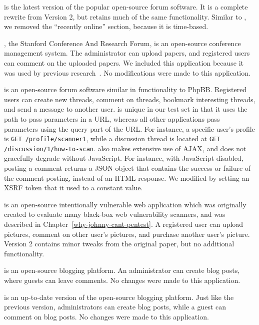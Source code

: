 \noindent \textbf{\phpbbthree{}} is the latest version of the popular
open-source forum software. It is a complete rewrite from Version 2, but
retains much of the same functionality. Similar to \phpbbtwo{}, we removed the
``recently online'' section, because it is time-based.

\noindent \textbf{\scarf{}}, the Stanford Conference And Research Forum, is an
open-source conference management system. The administrator can upload papers,
and registered users can comment on the uploaded papers. We included this
application because it was used by previous
research~\cite{li11:BLOCK,balzarotti07:mimosa,cova07:swaddler,li12:sentinel}. No modifications were made to
this application.

\noindent \textbf{\vanillaforums{}} is an open-source forum software similar in
functionality to PhpBB. Registered users can create new threads, comment on
threads, bookmark interesting threads, and send a message to another user.
\vanillaforums{} is unique in our test set in that it uses the path to pass
parameters in a URL, whereas all other applications pass parameters using the
query part of the URL. For instance, a specific user's profile is \texttt{GET
  /profile/scanner1}, while a discussion thread is located at \texttt{GET
  /discussion/1/how-to-scan}. \vanillaforums{} also makes extensive use of
AJAX, and does not gracefully degrade without JavaScript. For instance, with
JavaScript disabled, posting a comment returns a JSON object that contains the
success or failure of the comment posting, instead of an HTML response. We
modified \vanillaforums{} by setting an XSRF token that it used to a constant
value.

\noindent \textbf{\wackopicko{}} is an open-source intentionally vulnerable web
application which was originally created to evaluate many black-box web
vulnerability scanners, and was described in Chapter~\ref{why-johnny-cant-pentest}. A registered user can upload
pictures, comment on other user's pictures, and purchase another user's
picture. Version 2 contains minor tweaks from the original paper, but no
additional functionality.

\noindent \textbf{\wordpresstwo{}} is an open-source blogging platform. An
administrator can create blog posts, where guests can leave comments. No
changes were made to this application.

\noindent \textbf{\wordpress{}} is an up-to-date version of the open-source
blogging platform. Just like the previous version, administrators can create
blog posts, while a guest can comment on blog posts. No changes were made to
this application.



